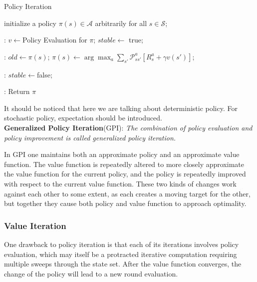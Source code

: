 \documentclass{progartcn}
\begin{document}
			\begin{algorithm}[H]
			\caption{Policy Iteration}
			\label{alg: Policy Iteration}
			\begin{algorithmic}[1]
            \State initialize a policy $\pi(s)\in\mathcal{A}$ arbitrarily for all $s\in\mathcal{S}$;

            :
				\State $v\gets$Policy Evaluation for $\pi$;
            	\State $stable\gets$ true;

            	:
            		\State $old\gets \pi(s)$;
            		\State $\pi(s)\gets\arg\max_{a}\sum_{s'}\mathcal{P}_{ss'}^a[R_s^a+\gamma v(s')]$;
            		
            		:
	            		\State $stable\gets$false;
	            	\EndIf
	            \EndFor


	            :
	            	\State Return $\pi$\;
	            \EndIf
	        \EndFor
	        \end{algorithmic}
            \end{algorithm}

            It should be noticed that here we are talking about deterministic policy. For stochastic policy, expectation should be introduced.\\

			\textbf{Generalized Policy Iteration}(GPI): \textit{The combination of policy evaluation and policy improvement is called generalized policy iteration.}

			In GPI one maintains both an approximate policy and an approximate value function. The value function is repeatedly altered to more closely approximate the value function for the current policy, and the policy is repeatedly improved with respect to the current value function. These two kinds of changes work against each other to some extent, as each creates a moving target for the other, but together they cause both policy and value function to approach optimality.\\


	\subsubsection{Value Iteration}

			One drawback to policy iteration is that each of its iterations involves policy evaluation, which may itself be a protracted iterative computation requiring multiple sweeps through the state set. After the value function converges, the change of the policy will lead to a new round evaluation.
\end{document}
